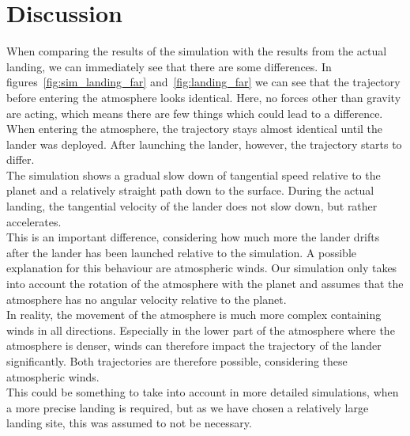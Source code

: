 \documentclass[reprint,english,notitlepage]{revtex4-2}
\begin{document}
\section{Discussion} \label{sec:discussion}
When comparing the results of the simulation with the results from the actual landing, we can immediately see that there are some differences.
In figures~\ref{fig:sim_landing_far} and~\ref{fig:landing_far} we can see that the trajectory before entering the atmosphere looks identical.
Here, no forces other than gravity are acting, which means there are few things which could lead to a difference.\\

When entering the atmosphere, the trajectory stays almost identical until the lander was deployed.
After launching the lander, however, the trajectory starts to differ.\\
The simulation shows a gradual slow down of tangential speed relative to the planet and a relatively straight path down to the surface.
During the actual landing, the tangential velocity of the lander does not slow down, but rather accelerates.\\
This is an important difference, considering how much more the lander drifts after the lander has been launched relative to the simulation.
A possible explanation for this behaviour are atmospheric winds.
Our simulation only takes into account the rotation of the atmosphere with the planet and assumes that the atmosphere has no angular velocity relative to the planet.\\
In reality, the movement of the atmosphere is much more complex containing winds in all directions.
Especially in the lower part of the atmosphere where the atmosphere is denser, winds can therefore impact the trajectory of the lander significantly.
Both trajectories are therefore possible, considering these atmospheric winds.\\
This could be something to take into account in more detailed simulations, when a more precise landing is required, but as we have chosen a relatively large landing site, this was assumed to not be necessary.\\
\end{document}
